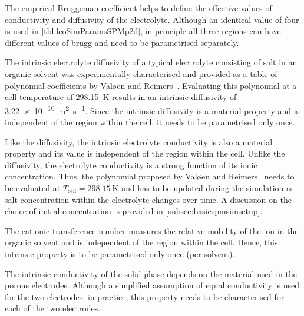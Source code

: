 \begin{enumdescriptnum}[leftmargin=!,itemsep=1ex,labelwidth=\widthof{$\symbf{\text{brugg}_j}\ \scriptstyle (\times 3)$abc}
    ,partopsep=0pt
    ,topsep=0pt
    ]

      The  empirical Bruggeman  coefficient  helps
    to  define  the   effective  values  of  conductivity   and  diffusivity  of
    the   electrolyte.   Although  an   identical   value   of  four   is   used
    in \cref{tbl:lcoSimParamsSPMp2d}, in  principle all  three regions  can have
    different values of brugg and need to be parametrised separately.

      The  intrinsic  electrolyte   diffusivity  of  a  typical
    electrolyte  consisting  of    salt in  an  organic  solvent  was
    experimentally  characterised   and  provided  as  a   table  of  polynomial
    coefficients  by  Valøen  and  Reimers~\cite{Valoen2005}.  Evaluating  this
    polynomial  at a  cell  temperature of  \SI{298.15}{\kelvin}  results in  an
    intrinsic diffusivity of \SI{3.22e-10}{\meter\squared\per\second}. Since the
    intrinsic  diffusivity is  a material  property  and is  independent of  the
    region within the cell, it needs to be parametrised only once.

       Like    the   diffusivity,   the
    intrinsic electrolyte conductivity is also a material property and its value
    is independent  of the region within  the cell. Unlike the  diffusivity, the
    electrolyte conductivity  is a strong  function of its  ionic concentration.
    Thus, the polynomial proposed by Valøen and Reimers~\cite{Valoen2005} needs
    to  be evaluated  at  $T_\text{cell}= \SI{298.15}{\kelvin}$  and  has to  be
    updated during the  simulation as salt concentration  within the electrolyte
    changes over time. A discussion on the choice of initial concentration is
    provided in \cref{subsec:basicspmsimsetup}.

      The  cationic transference  number
    measures the relative  mobility of the  ion in  the organic solvent
    and is  independent of  the region  within the  cell. Hence,  this intrinsic
    property is to be parametrised only once (per solvent).

      The  intrinsic conductivity  of
    the  solid phase  depends on  the material  used in  the porous  electrodes.
    Although a simplified  assumption of equal conductivity is used  for the two
    electrodes, in practice, this property needs to be characterised for each of
    the two electrodes.

\end{enumdescriptnum}

